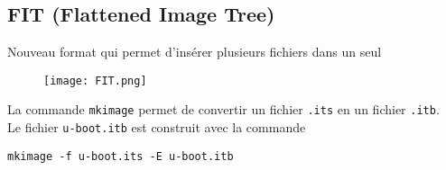 \subsection{FIT (Flattened Image Tree)}
Nouveau format qui permet d'insérer plusieurs fichiers dans un seul
\begin{figure}[H]
    \centering
    \texttt{[image: FIT.png]}
\end{figure}
La commande \verb!mkimage! permet de convertir un fichier \verb!.its! en un fichier \verb!.itb!.\\
Le fichier \verb!u-boot.itb! est construit avec la commande
\begin{center}
\verb!mkimage -f u-boot.its -E u-boot.itb!
\end{center}